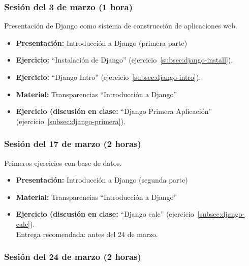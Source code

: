 \documentclass[a4paper,12pt]{article}
\begin{document}
\subsubsection{Sesión del 3 de marzo (1 hora)}

Presentación de Django como sistema de construcción de aplicaciones web.

\begin{itemize}
 \item \textbf{Presentación:} Introducción a Django (primera parte)
 \item \textbf{Ejercicio:} ``Instalación de Django'' (ejercicio~\ref{subsec:django-install}).
 \item \textbf{Ejercicio:} ``Django Intro'' (ejercicio~\ref{subsec:django-intro}).
 \item \textbf{Material:} Transparencias ``Introducción a Django''
 \item \textbf{Ejercicio (discusión en clase:} ``Django Primera Aplicación'' (ejercicio~\ref{subsec:django-primera}).
\end{itemize}

\subsubsection{Sesión del 17 de marzo (2 horas)}

Primeros ejercicios con base de datos.

\begin{itemize}
 \item \textbf{Presentación:} Introducción a Django (segunda parte)
 \item \textbf{Material:} Transparencias ``Introducción a Django''

  \item \textbf{Ejercicio (discusión en clase:} ``Django calc'' (ejercicio~\ref{subsec:django-calc}). \\
    Entrega recomendada: antes del 24 de marzo.
 
\end{itemize}

\subsubsection{Sesión del 24 de marzo (2 horas)}
\end{document}
